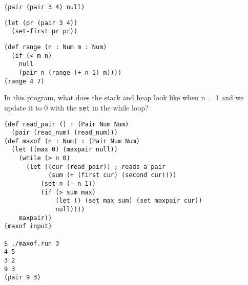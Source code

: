\documentclass[10pt, oneside]{article}
\begin{document}
\begin{verbatim}
(pair (pair 3 4) null)
\end{verbatim}

\vfill

\begin{verbatim}
(let (pr (pair 3 4))
  (set-first pr pr))
\end{verbatim}

\vfill

\begin{verbatim}
(def range (n : Num m : Num)
  (if (< m n)
    null
    (pair n (range (+ n 1) m))))
(range 4 7)
\end{verbatim}

\vfill

\newpage

In this program, what does the stack and heap look like when n = 1 and we
update it to 0 with the {\tt set} in the while loop?

\begin{verbatim}
(def read_pair () : (Pair Num Num)
  (pair (read_num) (read_num)))
(def maxof (n : Num) : (Pair Num Num)
  (let ((max 0) (maxpair null))
    (while (> n 0)
      (let ((cur (read_pair)) ; reads a pair
            (sum (+ (first cur) (second cur))))
          (set n (- n 1))
          (if (> sum max)
              (let () (set max sum) (set maxpair cur))
              null))))
    maxpair))
(maxof input)

$ ./maxof.run 3
4 5
3 2
9 3
(pair 9 3)
\end{verbatim}
\end{document}
